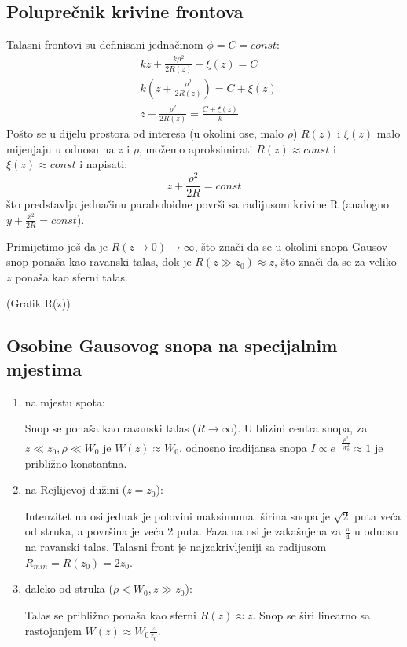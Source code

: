 \documentclass[fleqn]{report}
\begin{document}
\subsection{Poluprečnik krivine frontova}
Talasni frontovi su definisani jednačinom $\phi = C = const$:
\begin{align*}
     & kz + \frac{k\rho^2}{2R(z)} - \xi(z) = C             \\
     & k\left(z + \frac{\rho^2}{2R(z)}\right) = C + \xi(z) \\
     & z + \frac{\rho^2}{2R(z)} = \frac{C + \xi(z)}{k}
\end{align*}
Pošto se u dijelu prostora od interesa (u okolini ose, malo $\rho$) $R(z)$ i $\xi(z)$ malo mijenjaju u odnosu na $z$ i $\rho$, možemo aproksimirati $R(z) \approx const$ i $\xi(z) \approx const$ i napisati:
\begin{equation*}
    z + \frac{\rho^2}{2R} = const
\end{equation*}
što predstavlja jednačinu paraboloidne površi sa radijusom krivine R (analogno $y + \frac{x^2}{2R} = const$).

Primijetimo još da je $R(z \to 0) \to \infty$, što znači da se u okolini snopa Gausov snop ponaša kao ravanski talas, dok je $R(z \gg z_0) \approx z$, što znači da se za veliko $z$ ponaša kao sferni talas.

(Grafik R(z))

\subsection{Osobine Gausovog snopa na specijalnim mjestima}

\begin{enumerate}
    \item na mjestu spota:

          Snop se ponaša kao ravanski talas ($R \to \infty$).
          U blizini centra snopa, za $z \ll z_0, \rho \ll W_0$ je $W(z) \approx W_0$, odnosno iradijansa snopa $I \propto e^{-\frac{\rho^2}{W_0^2}} \approx 1$ je približno konstantna.

    \item na Rejlijevoj dužini ($z = z_0$):

          Intenzitet na osi jednak je polovini maksimuma.
          širina snopa je $\sqrt{2}$ puta veća od struka, a površina je veća 2 puta.
          Faza na osi je zakašnjena za $\frac{\pi}{4}$ u odnosu na ravanski talas.
          Talasni front je najzakrivljeniji sa radijusom $R_{min} = R(z_0) = 2z_0$.

    \item daleko od struka ($\rho < W_0, z \gg z_0$):

          Talas se približno ponaša kao sferni $R(z) \approx z$.
          Snop se širi linearno sa rastojanjem $W(z) \approx W_0 \frac{z}{z_0}$.
\end{enumerate}
\end{document}
